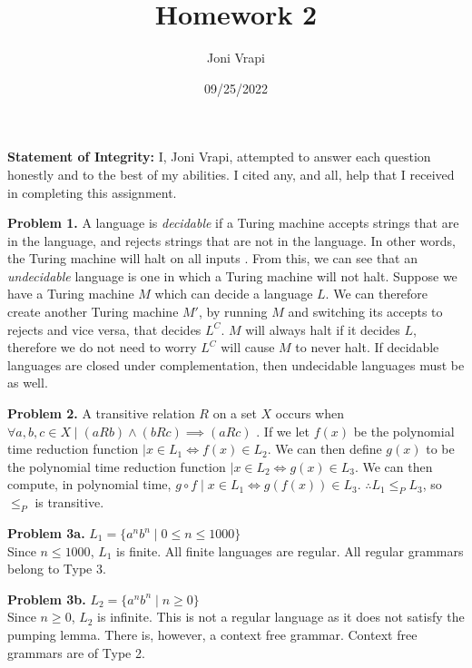 \documentclass{article}
\title{Homework 2}
\author{Joni Vrapi}
\date{09/25/2022}
\begin{document}
\maketitle

\textbf{Statement of Integrity:} I, Joni Vrapi, attempted to answer each question honestly and to the best of my abilities. I cited any, and all, help that I received in completing this assignment.

\hfill

\textbf{Problem 1.} A language is \emph{decidable} if a Turing machine accepts strings that are in the language, and rejects strings that are not in the language. In other words, the Turing machine will halt on all inputs \cite{website:1}. From this, we can see that an \emph{undecidable} language is one in which a Turing machine will not halt. Suppose we have a Turing machine $M$ which can decide a language $L$. We can therefore create another Turing machine $M'$, by running $M$ and switching its accepts to rejects and vice versa, that decides $L^C$. $M$ will always halt if it decides $L$, therefore we do not need to worry $L^C$ will cause $M$ to never halt. If decidable languages are closed under complementation, then undecidable languages must be as well.

\hfill

\textbf{Problem 2.} A transitive relation $R$ on a set $X$ occurs when $\forall a, b, c \in X \mid (aRb) \land (bRc) \implies (aRc)$ \cite{website:2}. If we let $f(x)$ be the polynomial time reduction function $\mid x \in L_1 \iff f(x) \in L_2$. We can then define $g(x)$ to be the polynomial time reduction function $\mid x \in L_2 \iff g(x) \in L_3$. We can then compute, in polynomial time, $g \circ f \mid x \in L_1 \iff g(f(x)) \in L_3$. $\therefore L_1 \leq_P L_3$, so $\leq_P$ is transitive.

\hfill

\textbf{Problem 3a.} $L_1 = \{ a^nb^n \mid 0 \leq n \leq 1000 \}$ \\
Since $n \leq 1000$,  $L_1$ is finite. All finite languages are regular. All regular grammars belong to Type 3.

\hfill

\textbf{Problem 3b.} $L_2 = \{ a^nb^n \mid n \geq 0 \}$ \\
Since $n \geq 0$,  $L_2$ is infinite. This is not a regular language as it does not satisfy the pumping lemma. There is, however, a context free grammar. Context free grammars are of Type 2.

\hfill
\end{document}
